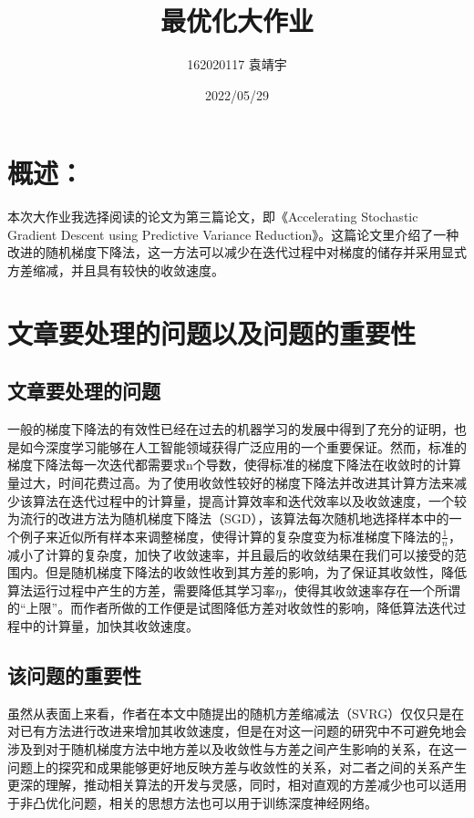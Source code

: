 \documentclass[12pt, a4paper, oneside]{ctexart}
\title{最优化大作业}
\author{162020117 袁靖宇}
\date{2022/05/29}
\begin{document}
\maketitle
\newpage
\section{概述：}

本次大作业我选择阅读的论文为第三篇论文，即《Accelerating Stochastic Gradient Descent using Predictive Variance Reduction》。这篇论文里介绍了一种改进的随机梯度下降法，这一方法可以减少在迭代过程中对梯度的储存并采用显式方差缩减，并且具有较快的收敛速度。
\\[8pt]
\section{文章要处理的问题以及问题的重要性}
\subsection{文章要处理的问题}
一般的梯度下降法的有效性已经在过去的机器学习的发展中得到了充分的证明，也是如今深度学习能够在人工智能领域获得广泛应用的一个重要保证。然而，标准的梯度下降法每一次迭代都需要求n个导数，使得标准的梯度下降法在收敛时的计算量过大，时间花费过高。为了使用收敛性较好的梯度下降法并改进其计算方法来减少该算法在迭代过程中的计算量，提高计算效率和迭代效率以及收敛速度，一个较为流行的改进方法为随机梯度下降法（SGD），该算法每次随机地选择样本中的一个例子来近似所有样本来调整梯度，使得计算的复杂度变为标准梯度下降法的$\frac{1}{n}$，减小了计算的复杂度，加快了收敛速率，并且最后的收敛结果在我们可以接受的范围内。但是随机梯度下降法的收敛性收到其方差的影响，为了保证其收敛性，降低算法运行过程中产生的方差，需要降低其学习率$\eta$，使得其收敛速率存在一个所谓的“上限”。而作者所做的工作便是试图降低方差对收敛性的影响，降低算法迭代过程中的计算量，加快其收敛速度。
\\[8pt]
\subsection{该问题的重要性}
虽然从表面上来看，作者在本文中随提出的随机方差缩减法（SVRG）仅仅只是在对已有方法进行改进来增加其收敛速度，但是在对这一问题的研究中不可避免地会涉及到对于随机梯度方法中地方差以及收敛性与方差之间产生影响的关系，在这一问题上的探究和成果能够更好地反映方差与收敛性的关系，对二者之间的关系产生更深的理解，推动相关算法的开发与灵感，同时，相对直观的方差减少也可以适用于非凸优化问题，相关的思想方法也可以用于训练深度神经网络。
\\[8pt]
\end{document}
